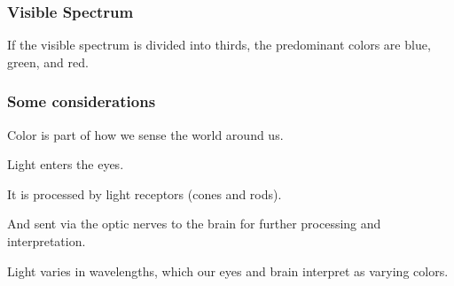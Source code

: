 \documentclass[12pt]{beamer}\usepackage[]{graphicx}\usepackage[]{color}
\begin{document}
\begin{frame}
\frametitle{Visible Spectrum}
\begin{center}

If the visible spectrum is divided into thirds, the predominant colors are blue, green, and red.
\end{center}
\end{frame}


\begin{frame}
\frametitle{Some considerations}

\bbi
  \item Color is part of how we sense the world around us.
  \item Light enters the eyes.
  \item It is processed by light receptors (cones and rods).
  \item And sent via the optic nerves to the brain for further processing and
  interpretation.
  \item Light varies in wavelengths, which our eyes and brain interpret as
  varying colors.
\ei

\end{frame}

\end{document}
